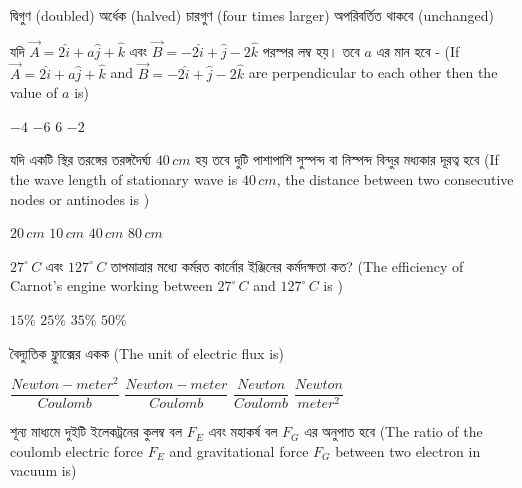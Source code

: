 \documentclass[addpoints]{exam}
\begin{document}
\begin{questions}
\begin{oneparchoices}
\choice দ্বিগুণ (doubled)
\hspace*{-.4cm}\choice অর্ধেক (halved)
\hspace*{-.4cm}\choice চারগুণ (four times larger)
\hspace*{-.4cm}\choice অপরিবর্তিত থাকবে (unchanged)
\end{oneparchoices}


\question  যদি $ \vec{A} = 2\hat{i} + a\hat{j} + \hat{k} $ এবং $ \vec{B} = -2\hat{i}+\hat{j}-2\hat{k} $ পরস্পর লম্ব হয়। তবে $ a $ এর মান হবে - (If $ \vec{A} = 2\hat{i} + a\hat{j} + \hat{k} $ and $ \vec{B} = -2\hat{i}+\hat{j}-2\hat{k} $ are perpendicular to each other then the value of $ a $ is)

\begin{oneparchoices}
 \choice $ -4 $
\choice $ -6 $
\choice $ 6 $
\choice $ -2 $
\end{oneparchoices}

\question যদি একটি স্থির তরঙ্গের তরঙ্গদৈর্ঘ্য $ 40\,cm $ হয় তবে দুটি পাশাপাশি সুস্পন্দ বা নিস্পন্দ বিন্দুর মধ্যকার দূরত্ব হবে (If the wave length of stationary wave is $ 40\,cm $, the distance between two consecutive nodes or antinodes is )

\begin{oneparchoices}
\choice $ 20\,cm $
\choice $ 10\,cm $
\choice $ 40\,cm $
\choice $ 80\,cm $
\end{oneparchoices}


\question $ 27^{\circ}\,C $ এবং $ 127^{\circ}\,C $ তাপমাত্রার মধ্যে কর্মরত কার্নোর ইঞ্জিনের কর্মদক্ষতা কত? (The efficiency of Carnot's engine working between $ 27^{\circ}\,C $ and $ 127^{\circ}\,C $ is )

\begin{oneparchoices}
\choice  $ 15\% $
\choice   $ 25\% $
\choice   $ 35\% $
\choice   $ 50\% $
\end{oneparchoices}

\question  বৈদ্যুতিক ফ্লুাক্সের একক (The unit of electric flux is)

\begin{oneparchoices}
\choice $ \dfrac{Newton-meter^{2}}{Coulomb} $
\choice $ \dfrac{Newton-meter}{Coulomb} $
\choice $ \dfrac{Newton}{Coulomb} $
\choice $ \dfrac{Newton}{meter^{2}} $
\end{oneparchoices}

\question  শূন্য মাধ্যমে দুইটি ইলেকট্রনের কুলম্ব বল $ F_{E} $ এবং মহাকর্ষ বল $ {F}_{G} $ এর অনুপাত হবে (The ratio of the coulomb electric force $ F_{E} $ and gravitational force $ {F}_{G} $ between two electron in vacuum is)  


\end{questions}
\end{document}

